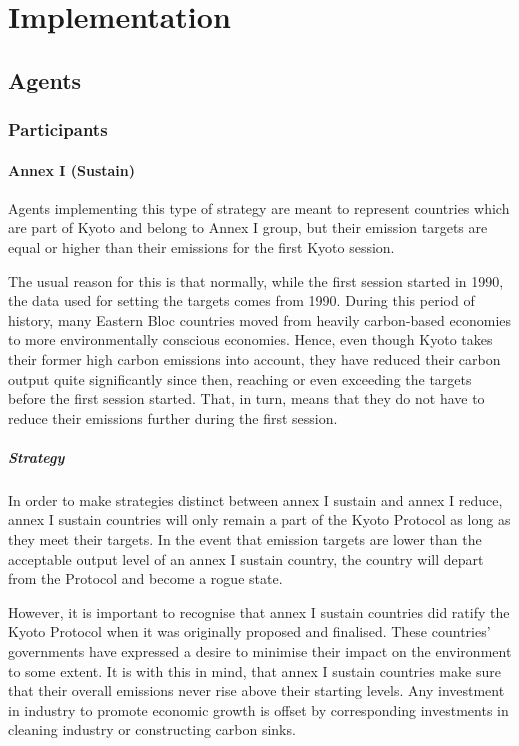 \section{Implementation}

\subsection{Agents}

\subsubsection{Participants}

\paragraph{Annex I (Sustain)}

Agents implementing this type of strategy are meant to represent countries which are part of Kyoto and belong to Annex I group, but their emission targets are equal or higher than their emissions for the first Kyoto session.

The usual reason for this is that normally, while the first session started in 1990, the data used for setting the targets comes from 1990. During this period of history, many Eastern Bloc countries moved from heavily carbon-based economies to more environmentally conscious economies. Hence, even though Kyoto takes their former high carbon emissions into account, they have reduced their carbon output quite significantly since then, reaching or even exceeding the targets before the first session started. That, in turn, means that they do not have to reduce their emissions further during the first session.

\subparagraph{Strategy}

In order to make strategies distinct between annex I sustain and annex I reduce, annex I sustain countries will only remain a part of the Kyoto Protocol as long as they meet their targets. In the event that emission targets are lower than the acceptable output level of an annex I sustain country, the country will depart from the Protocol and become a rogue state. 

However, it is important to recognise that annex I sustain countries did ratify the Kyoto Protocol when it was originally proposed and finalised. These countries' governments have expressed a desire to minimise their impact on the environment to some extent. It is with this in mind, that annex I sustain countries make sure that their overall emissions never rise above their starting levels. Any investment in industry to promote economic growth is offset by corresponding investments in cleaning industry or constructing carbon sinks.

